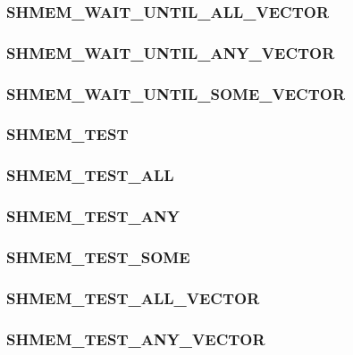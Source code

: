 \documentclass[10pt,oneside]{book}
\begin{document}
\subsubsection{\textbf{SHMEM\_WAIT\_UNTIL\_ALL\_VECTOR}}\label{subsec:shmem_wait_until_all_vector}


\subsubsection{\textbf{SHMEM\_WAIT\_UNTIL\_ANY\_VECTOR}}\label{subsec:shmem_wait_until_any_vector}


\subsubsection{\textbf{SHMEM\_WAIT\_UNTIL\_SOME\_VECTOR}}\label{subsec:shmem_wait_until_some_vector}


\subsubsection{\textbf{SHMEM\_TEST}}\label{subsec:shmem_test}


\subsubsection{\textbf{SHMEM\_TEST\_ALL}}\label{subsec:shmem_test_all}


\subsubsection{\textbf{SHMEM\_TEST\_ANY}}\label{subsec:shmem_test_any}


\subsubsection{\textbf{SHMEM\_TEST\_SOME}}\label{subsec:shmem_test_some}


\subsubsection{\textbf{SHMEM\_TEST\_ALL\_VECTOR}}\label{subsec:shmem_test_all_vector}


\subsubsection{\textbf{SHMEM\_TEST\_ANY\_VECTOR}}\label{subsec:shmem_test_any_vector}

\end{document}

